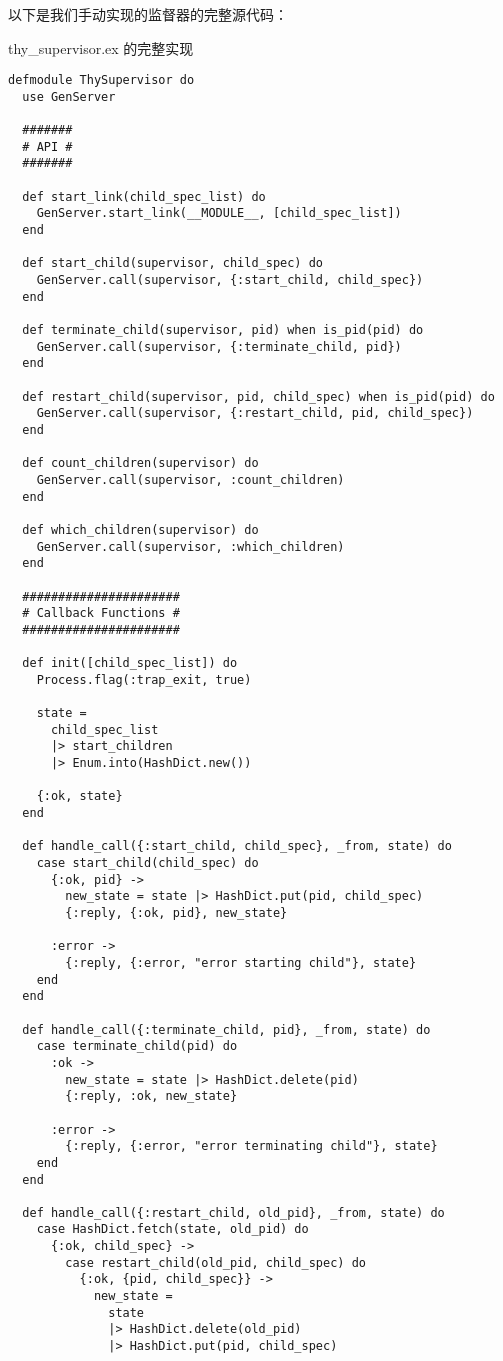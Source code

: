 以下是我们手动实现的监督器的完整源代码：

\begin{code}{thy\_supervisor.ex 的完整实现}
\begin{verbatim}
defmodule ThySupervisor do
  use GenServer

  #######
  # API #
  #######

  def start_link(child_spec_list) do
    GenServer.start_link(__MODULE__, [child_spec_list])
  end

  def start_child(supervisor, child_spec) do
    GenServer.call(supervisor, {:start_child, child_spec})
  end

  def terminate_child(supervisor, pid) when is_pid(pid) do
    GenServer.call(supervisor, {:terminate_child, pid})
  end

  def restart_child(supervisor, pid, child_spec) when is_pid(pid) do
    GenServer.call(supervisor, {:restart_child, pid, child_spec})
  end

  def count_children(supervisor) do
    GenServer.call(supervisor, :count_children)
  end

  def which_children(supervisor) do
    GenServer.call(supervisor, :which_children)
  end

  ######################
  # Callback Functions #
  ######################

  def init([child_spec_list]) do
    Process.flag(:trap_exit, true)

    state =
      child_spec_list
      |> start_children
      |> Enum.into(HashDict.new())

    {:ok, state}
  end

  def handle_call({:start_child, child_spec}, _from, state) do
    case start_child(child_spec) do
      {:ok, pid} ->
        new_state = state |> HashDict.put(pid, child_spec)
        {:reply, {:ok, pid}, new_state}

      :error ->
        {:reply, {:error, "error starting child"}, state}
    end
  end

  def handle_call({:terminate_child, pid}, _from, state) do
    case terminate_child(pid) do
      :ok ->
        new_state = state |> HashDict.delete(pid)
        {:reply, :ok, new_state}

      :error ->
        {:reply, {:error, "error terminating child"}, state}
    end
  end

  def handle_call({:restart_child, old_pid}, _from, state) do
    case HashDict.fetch(state, old_pid) do
      {:ok, child_spec} ->
        case restart_child(old_pid, child_spec) do
          {:ok, {pid, child_spec}} ->
            new_state =
              state
              |> HashDict.delete(old_pid)
              |> HashDict.put(pid, child_spec)


\end{verbatim}
\end{code}
